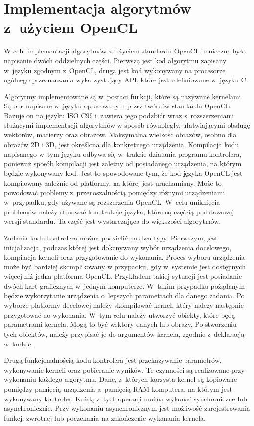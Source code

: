 \section{Implementacja algorytmów z~użyciem OpenCL}  
\label{sec:szczegolyOpenCL}

W celu implementacji algorytmów z~użyciem standardu OpenCL konieczne było napisanie dwóch oddzielnych części. Pierwszą jest kod algorytmu zapisany w~języku zgodnym z~OpenCL, drugą jest kod wykonywany na procesorze ogólnego przeznaczania wykorzystujący API, które jest zdefiniowane w~języku C.

Algorytmy implementowane są w~postaci funkcji, które są nazywane kernelami. Są one napisane w~języku opracowanym przez twórców standardu OpenCL. Bazuje on na języku ISO C99 i~zawiera jego podzbiór wraz z~rozszerzeniami służącymi implementacji algorytmów w sposób równoległy, ułatwiającymi obsługę wektorów, macierzy oraz obrazów. Maksymalna wielkość obrazów, osobno dla obrazów 2D i 3D, jest określona dla konkretnego urządzenia. Kompilacja kodu napisanego w~tym języku odbywa się w~trakcie działania programu kontrolera, ponieważ sposób kompilacji jest zależny od posiadanego urządzenia, na którym będzie wykonywany kod. Jest to spowodowane tym, że kod języka OpenCL jest kompilowany zależnie od platformy, na której jest uruchamiany. Może to powodować problemy z~przenoszalnością pomiędzy różnymi urządzeniami w~przypadku, gdy używane są rozszerzenia OpenCL. W~celu uniknięcia problemów należy stosować konstrukcje języka, które są częścią podstawowej wersji standardu. Ta część jest wystarczająca do większości algorytmów.

Zadania kodu kontrolera można podzielić na dwa typy. Pierwszym, jest inicjalizacja, podczas której jest dokonywany wybór urządzenia docelowego, kompilacja kerneli oraz przygotowanie do wykonania. Proces wyboru urządzenia może być bardziej skomplikowany w przypadku, gdy w~systemie jest dostępnych więcej niż jedna platforma OpenCL. Przykładem takiej sytuacji jest posiadanie dwóch kart graficznych w~jednym komputerze. W~takim przypadku pożądanym będzie wykorzytanie urządzenia o~lepszych parametrach dla danego zadania. Po wyborze platformy docelowej należy skompilować kernel, który należy następnie przygotować do wykonania. W~tym celu należy utworzyć obiekty, które będą parametrami kernela. Mogą to być wektory danych lub obrazy. Po stworzeniu tych obiektów, należy przypisać je do argumentów kernela, zgodnie z~deklaracją w~kodzie.

Drugą funkcjonalnością kodu kontrolera jest przekazywanie parametrów, wykonywanie kerneli oraz pobieranie wyników. Te czynności są realizowane przy wykonaniu każdego algorytmu. Dane, z~których korzysta kernel są kopiowane pomiędzy pamięcią urządzenia a~pamięcią RAM komputera, na którym jest wykonywany kontroler. Każdą z~tych operacji można wykonać synchroniczne lub asynchronicznie. Przy wykonaniu asynchronicznym jest możliwość zarejestrowania funkcji zwrotnej lub poczekania na zakończenie wykonania kernela.

